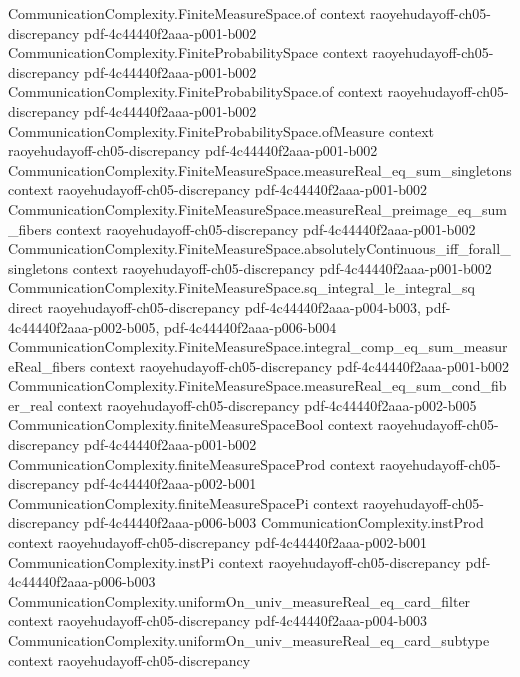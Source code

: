 \begin{theorem}
\proofstep
  {CommunicationComplexity.FiniteMeasureSpace.of}
  {context}
  {raoyehudayoff-ch05-discrepancy}
  {pdf-4c44440f2aaa-p001-b002}
\proofstep
  {CommunicationComplexity.FiniteProbabilitySpace}
  {context}
  {raoyehudayoff-ch05-discrepancy}
  {pdf-4c44440f2aaa-p001-b002}
\proofstep
  {CommunicationComplexity.FiniteProbabilitySpace.of}
  {context}
  {raoyehudayoff-ch05-discrepancy}
  {pdf-4c44440f2aaa-p001-b002}
\proofstep
  {CommunicationComplexity.FiniteProbabilitySpace.ofMeasure}
  {context}
  {raoyehudayoff-ch05-discrepancy}
  {pdf-4c44440f2aaa-p001-b002}
\proofstep
  {CommunicationComplexity.FiniteMeasureSpace.measureReal_eq_sum_singletons}
  {context}
  {raoyehudayoff-ch05-discrepancy}
  {pdf-4c44440f2aaa-p001-b002}
\proofstep
  {CommunicationComplexity.FiniteMeasureSpace.measureReal_preimage_eq_sum_fibers}
  {context}
  {raoyehudayoff-ch05-discrepancy}
  {pdf-4c44440f2aaa-p001-b002}
\proofstep
  {CommunicationComplexity.FiniteMeasureSpace.absolutelyContinuous_iff_forall_singletons}
  {context}
  {raoyehudayoff-ch05-discrepancy}
  {pdf-4c44440f2aaa-p001-b002}
\proofstep
  {CommunicationComplexity.FiniteMeasureSpace.sq_integral_le_integral_sq}
  {direct}
  {raoyehudayoff-ch05-discrepancy}
  {pdf-4c44440f2aaa-p004-b003,
    pdf-4c44440f2aaa-p002-b005,
    pdf-4c44440f2aaa-p006-b004}
\proofstep
  {CommunicationComplexity.FiniteMeasureSpace.integral_comp_eq_sum_measureReal_fibers}
  {context}
  {raoyehudayoff-ch05-discrepancy}
  {pdf-4c44440f2aaa-p001-b002}
\proofstep
  {CommunicationComplexity.FiniteMeasureSpace.measureReal_eq_sum_cond_fiber_real}
  {context}
  {raoyehudayoff-ch05-discrepancy}
  {pdf-4c44440f2aaa-p002-b005}
\proofstep
  {CommunicationComplexity.finiteMeasureSpaceBool}
  {context}
  {raoyehudayoff-ch05-discrepancy}
  {pdf-4c44440f2aaa-p001-b002}
\proofstep
  {CommunicationComplexity.finiteMeasureSpaceProd}
  {context}
  {raoyehudayoff-ch05-discrepancy}
  {pdf-4c44440f2aaa-p002-b001}
\proofstep
  {CommunicationComplexity.finiteMeasureSpacePi}
  {context}
  {raoyehudayoff-ch05-discrepancy}
  {pdf-4c44440f2aaa-p006-b003}
\proofstep
  {CommunicationComplexity.instProd}
  {context}
  {raoyehudayoff-ch05-discrepancy}
  {pdf-4c44440f2aaa-p002-b001}
\proofstep
  {CommunicationComplexity.instPi}
  {context}
  {raoyehudayoff-ch05-discrepancy}
  {pdf-4c44440f2aaa-p006-b003}
\proofstep
  {CommunicationComplexity.uniformOn_univ_measureReal_eq_card_filter}
  {context}
  {raoyehudayoff-ch05-discrepancy}
  {pdf-4c44440f2aaa-p004-b003}
\proofstep
  {CommunicationComplexity.uniformOn_univ_measureReal_eq_card_subtype}
  {context}
  {raoyehudayoff-ch05-discrepancy}

\end{theorem}
